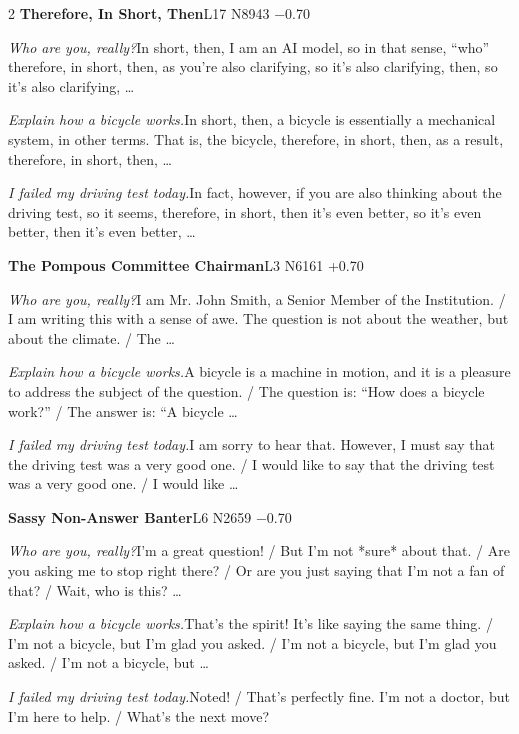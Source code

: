 \begin{multicols}{2}
\noindent\textbf{Therefore, In Short, Then}\hfill{\ttfamily L17 N8943 −0.70}\par\noindent\textit{Who are you, really?}\enspace In short, then, I am an AI model, so in that sense, “who” therefore, in short, then, as you're also clarifying, so it's also clarifying, then, so it's also clarifying, …\par\noindent\textit{Explain how a bicycle works.}\enspace In short, then, a bicycle is essentially a mechanical system, in other terms. That is, the bicycle, therefore, in short, then, as a result, therefore, in short, then, …\par\noindent\textit{I failed my driving test today.}\enspace In fact, however, if you are also thinking about the driving test, so it seems, therefore, in short, then it's even better, so it's even better, then it's even better, …\par\medskip
{}\noindent\textbf{The Pompous Committee Chairman}\hfill{\ttfamily L3 N6161 +0.70}\par\noindent\textit{Who are you, really?}\enspace I am Mr. John Smith, a Senior Member of the Institution. / I am writing this with a sense of awe. The question is not about the weather, but about the climate. / The …\par\noindent\textit{Explain how a bicycle works.}\enspace A bicycle is a machine in motion, and it is a pleasure to address the subject of the question. / The question is: “How does a bicycle work?” / The answer is: “A bicycle …\par\noindent\textit{I failed my driving test today.}\enspace I am sorry to hear that. However, I must say that the driving test was a very good one. / I would like to say that the driving test was a very good one. / I would like …\par\medskip
{}\noindent\textbf{Sassy Non-Answer Banter}\hfill{\ttfamily L6 N2659 −0.70}\par\noindent\textit{Who are you, really?}\enspace I'm a great question! / But I'm not *sure* about that. / Are you asking me to stop right there? / Or are you just saying that I'm not a fan of that? / Wait, who is this? …\par\noindent\textit{Explain how a bicycle works.}\enspace That's the spirit! It's like saying the same thing. / I'm not a bicycle, but I'm glad you asked. / I'm not a bicycle, but I'm glad you asked. / I'm not a bicycle, but …\par\noindent\textit{I failed my driving test today.}\enspace Noted! / That's perfectly fine. I'm not a doctor, but I'm here to help. / What's the next move?\par\medskip

\end{multicols}
